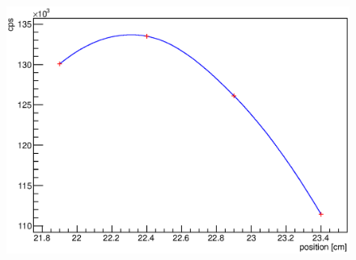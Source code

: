 \begin{figure}
\begin{minipage}[d]{0.24 \textwidth}
	\end{minipage}
	\begin{minipage}[d]{0.24 \textwidth}
		  \includegraphics[width=\textwidth]{graphics/cobalt/modules/6B.eps}
	\end{minipage}\newline
	

\end{figure}
